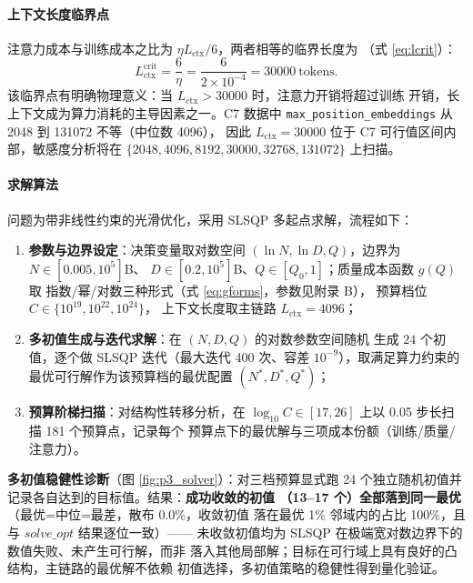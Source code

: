 \paragraph{上下文长度临界点}

注意力成本与训练成本之比为 $\eta L_{\text{ctx}}/6$，两者相等的临界长度为
（式 \ref{eq:lcrit}）：
\begin{equation}
L_{\text{ctx}}^{\text{crit}}=\frac{6}{\eta}=\frac{6}{2\times10^{-4}}
=30000\ \text{tokens}.
\label{eq:lcrit}
\end{equation}
该临界点有明确物理意义：当 $L_{\text{ctx}}>30000$ 时，注意力开销将超过训练
开销，长上下文成为算力消耗的主导因素之一。C7 数据中
\texttt{max\_position\_embeddings} 从 2048 到 131072 不等（中位数 4096），
因此 $L_{\text{ctx}}=30000$ 位于 C7 可行值区间内部，敏感度分析将在
$\{2048,4096,8192,30000,32768,131072\}$ 上扫描。

\paragraph{求解算法}

问题为带非线性约束的光滑优化，采用 SLSQP 多起点求解，流程如下：

\begin{enumerate}
\item \textbf{参数与边界设定}：决策变量取对数空间
$(\ln N,\ln D,Q)$，边界为 $N\in[0.005,10^{5}]$B、
$D\in[0.2,10^{5}]$B、$Q\in[Q_0,1]$；质量成本函数 $g(Q)$ 取
指数/幂/对数三种形式（式 \ref{eq:gforms}，参数见附录 B），
预算档位 $C\in\{10^{19},10^{22},10^{24}\}$，
上下文长度取主链路 $L_{\text{ctx}}=4096$；
\item \textbf{多初值生成与迭代求解}：在 $(N,D,Q)$ 的对数参数空间随机
生成 $24$ 个初值，逐个做 SLSQP 迭代（最大迭代 400 次、容差
$10^{-9}$），取满足算力约束的最优可行解作为该预算档的最优配置
$(N^{*},D^{*},Q^{*})$；
\item \textbf{预算阶梯扫描}：对结构性转移分析，在
$\log_{10}C\in[17,26]$ 上以 0.05 步长扫描 181 个预算点，记录每个
预算点下的最优解与三项成本份额（训练/质量/注意力）。
\end{enumerate}

\textbf{多初值稳健性诊断}（图 \ref{fig:p3_solver}）：对三档预算显式跑
24 个独立随机初值并记录各自达到的目标值。结果：\textbf{成功收敛的初值
（13--17 个）全部落到同一最优}（最优=中位=最差，散布 0.0\%，收敛初值
落在最优 1\% 邻域内的占比 100\%，且与 $solve\_opt$ 结果逐位一致）——
未收敛初值均为 SLSQP 在极端宽对数边界下的数值失败、未产生可行解，而非
落入其他局部解；目标在可行域上具有良好的凸结构，主链路的最优解不依赖
初值选择，多初值策略的稳健性得到量化验证。

